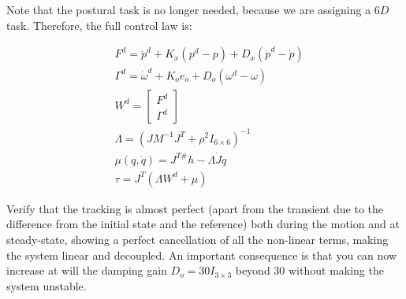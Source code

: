 \documentclass[11pt]{article}
\newcommand{\mat}[1]{\ensuremath{\begin{bmatrix}#1\end{bmatrix}}}	%
\begin{document}
Note that the postural task is no longer needed, because we are assigning a $6D$ task. Therefore, the full control law is:
 
\begin{align}
& F^d = \ddot{p}^d + K_x(p^d - p) + D_x(\dot{p}^d -\dot{p})  \\
& \Gamma^d  = \dot{\omega}^d + K_{o} e_o  + D_o(\omega^d - \omega)  \\
& W^d = \mat{F^d \\ \Gamma^d} \\
& \Lambda = (J M^{-1}J^T + \rho^2 I_{6 \times6})^{-1}\\
&\mu(q,\dot{q})  = J^{T\#} h -\Lambda \dot{J} \dot{q} \\
& \tau = J^T\left( \Lambda W^d + \mu \right)
\end{align} 

Verify that the tracking is almost perfect (apart from the transient due to the difference from the initial state and the reference) both during the motion and at steady-state, showing a perfect cancellation of all the non-linear terms, making the system linear and decoupled. 
An important consequence is that you can now increase at will the damping gain  $D_o = 30I_{3\times3}$ beyond 30 without making the system unstable.

 
\end{document}
